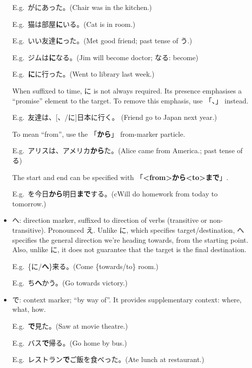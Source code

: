 \documentclass[../nihongo-gakushuu-kyouzai.tex]{subfiles}
\begin{document}
\begin{itemize}
    E.g.\ がにあった。(Chair was in the kitchen.)

    E.g.\ 猫は部屋\textbf{に}いる。(Cat is in room.)

    E.g.\ いい友達\textbf{に}った。(Met good friend; past tense of う.)

    E.g.\ ジムは\textbf{に}なる。(Jim will become doctor; なる: become)

    E.g.\ \textbf{に}に行った。(Went to library last week.)

    When suffixed to time, に is not always required. Its presence emphasises a ``promise'' element to the target. To remove this emphasis, use 「、」 instead.

    E.g.\ 友達は、[、/に]日本に行く。 (Friend go to Japan next year.)

    To mean ``from'', use the 「\textbf{から}」 from-marker particle.

    E.g.\ アリスは、アメリカ\textbf{から}た。(Alice came from America.; past tense of る)

    The start and end can be specified with 「\textbf{<from>から<to>まで}」.

    E.g.\ を今日\textbf{から}明日\textbf{まで}する。(cWill do homework from today to tomorrow.)

    \item へ: direction marker, suffixed to direction of verbs (transitive or non-transitive). Pronounced え. Unlike に, which specifies target/destination, へ specifies the general direction we're heading towards, from the starting point. Also, unlike に, it does not guarantee that the target is the final destination. 

    E.g.\ \{に/\textbf{へ}\}来る。(Come \{towards/to\} room.)

    E.g.\ ち\textbf{へ}かう。(Go towards victory.)
    \item で: context marker; ``by way of''. It provides supplementary context: where, what, how.

    E.g.\ \textbf{で}見た。(Saw at movie theatre.)

    E.g.\ バス\textbf{で}帰る。(Go home by bus.)

    E.g.\ レストラン\textbf{で}ご飯を食べった。(Ate lunch at restaurant.)
\end{itemize}
\end{document}
